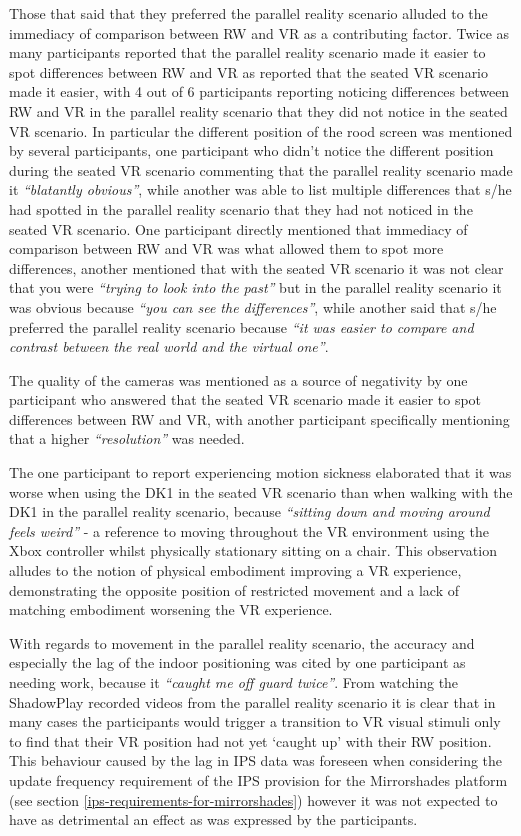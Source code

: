 Those that said that they preferred the parallel reality scenario alluded to the immediacy of comparison between RW and VR as a contributing factor. Twice as many participants reported that the parallel reality scenario made it easier to spot differences between RW and VR as reported that the seated VR scenario made it easier, with 4 out of 6 participants reporting noticing differences between RW and VR in the parallel reality scenario that they did not notice in the seated VR scenario. In particular the different position of the rood screen was mentioned by several participants, one participant who didn't notice the different position during the seated VR scenario commenting that the parallel reality scenario made it \textit{``blatantly obvious''}, while another was able to list multiple differences that s/he had spotted in the parallel reality scenario that they had not noticed in the seated VR scenario. One participant directly mentioned that immediacy of comparison between RW and VR was what allowed them to spot more differences, another mentioned that with the seated VR scenario it was not clear that you were \textit{``trying to look into the past''} but in the parallel reality scenario it was obvious because \textit{``you can see the differences''}, while another said that s/he preferred the parallel reality scenario because \textit{``it was easier to compare and contrast between the real world and the virtual one''}.

The quality of the cameras was mentioned as a source of negativity by one participant who answered that the seated VR scenario made it easier to spot differences between RW and VR, with another participant specifically mentioning that a higher \textit{``resolution''} was needed.

The one participant to report experiencing motion sickness elaborated that it was worse when using the DK1 in the seated VR scenario than when walking with the DK1 in the parallel reality scenario, because \textit{``sitting down and moving around feels weird''} - a reference to moving throughout the VR environment using the Xbox controller whilst physically stationary sitting on a chair. This observation alludes to the notion of physical embodiment improving a VR experience, demonstrating the opposite position of restricted movement and a lack of matching embodiment worsening the VR experience.

With regards to movement in the parallel reality scenario, the accuracy and especially the lag of the indoor positioning was cited by one participant as needing work, because it \textit{``caught me off guard twice''}. From watching the ShadowPlay recorded videos from the parallel reality scenario it is clear that in many cases the participants would trigger a transition to VR visual stimuli only to find that their VR position had not yet `caught up' with their RW position. This behaviour caused by the lag in IPS data was foreseen when considering the update frequency requirement of the IPS provision for the Mirrorshades platform (see section \ref{ips-requirements-for-mirrorshades}) however it was not expected to have as detrimental an effect as was expressed by the participants.

